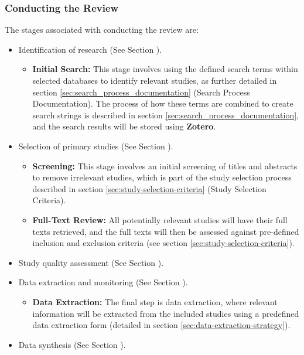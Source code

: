 \subsubsection{Conducting the Review}
The stages associated with conducting the review are:
\begin{itemize}
    \item Identification of research (See Section ).
        \begin{itemize}
            \item \textbf{Initial Search:} This stage involves using the defined search terms within selected
            databases to identify relevant studies, as further detailed in section \ref{sec:search_process_documentation} (Search Process Documentation). The process of how these terms are combined to create search
            strings is described in section \ref{sec:search_process_documentation}, and the search results will be stored using \textbf{Zotero}.
        \end{itemize}
    \item Selection of primary studies (See Section ).
        \begin{itemize}
            \item \textbf{Screening:} This stage involves an initial screening of titles and abstracts to remove
            irrelevant studies, which is part of the study selection process described in section \ref{sec:study-selection-criteria} (Study Selection Criteria). 
            \item \textbf{Full-Text Review:} All potentially relevant studies will have their full texts retrieved,
            and the full texts will then be assessed against pre-defined inclusion and exclusion criteria (see section \ref{sec:study-selection-criteria}).
        \end{itemize}
    \item Study quality assessment (See Section ).
    \item Data extraction and monitoring (See Section ).
        \begin{itemize}
            \item \textbf{Data Extraction:} The final step is data extraction, where relevant information will be
            extracted from the included studies using a predefined data extraction form (detailed in section \ref{sec:data-extraction-strategy}).
        \end{itemize}
    \item Data synthesis (See Section ).
\end{itemize}

